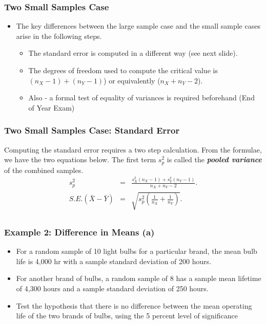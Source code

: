 \begin{frame}
\frametitle{Two Small Samples Case}
\begin{itemize}
\item The key differences between the large sample case and the small sample cases arise in the following steps.
    \begin{itemize}
    \item The standard error is computed in a different way (see next slide).
    \item The degrees of freedom used to compute the critical value is $(n_X-1) + (n_Y - 1)$) or equivalently ($n_X + n_Y - 2$).
    \item Also - a formal test of equality of variances is required beforehand (End of Year Exam)
    \end{itemize}
\end{itemize}
\end{frame}
\begin{frame}
\frametitle{Two Small Samples Case: Standard Error}
Computing the standard error requires a two step calculation. From the formulae, we have the two equations below. The first term $s_p^2$ is called the \textbf{\textit{pooled variance}} of the combined samples.
\begin{eqnarray*}
s_p^2&=&\frac{s_X^2(n_X-1)+s_Y^2(n_Y-1)}{n_X+n_Y-2}.\\
S.E.(\bar{X}-\bar{Y})&=&\sqrt{s_p^2\left(\frac{1}{n_X}+\frac{1}{n_Y}\right)}.\\
\end{eqnarray*}
\end{frame}


\begin{frame}
\frametitle{Example 2: Difference in Means (a) }
\begin{itemize}
\item For a random sample of 10 light bulbs for a particular brand, the mean bulb life is 4,000 hr with a sample standard deviation of 200 hours.
\item For another brand of bulbs, a random sample of 8 has a sample mean lifetime of 4,300 hours
and a sample standard deviation of 250 hours. \item Test the hypothesis that there is no difference between the
mean operating life of the two brands of bulbs, using the 5 percent level of significance
\end{itemize}
\end{frame}


